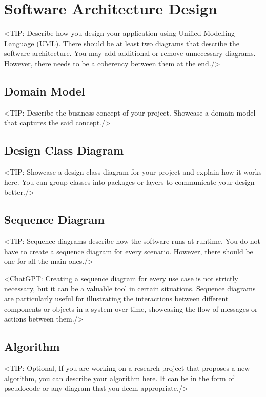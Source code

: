 \chapter{Software Architecture Design}
\label{chap:software-architecture-design}
<TIP: Describe how you design your application using Unified Modelling
Language (UML). There should be at least two diagrams that describe the
software architecture. You may add additional or remove unnecessary diagrams.
However, there needs to be a coherency between them at the end./>

\section{Domain Model}
\label{section:domain-model}
<TIP: Describe the business concept of your project. Showcase a
domain model that captures the said concept./>

\section{Design Class Diagram}
\label{section:design-class-diagram}
<TIP: Showcase a design class diagram for your project and explain
how it works here. You can group classes into packages or layers to communicate your
design better./>

\section{Sequence Diagram}
\label{section:sequence-diagram}
<TIP: Sequence diagrams describe how the software runs at runtime.
You do not have to create a sequence diagram for every scenario. However,
there should be one for all the main ones./>

<ChatGPT: Creating a sequence diagram for every use case is not
strictly necessary, but it can be a valuable tool in certain situations. Sequence
diagrams are particularly useful for illustrating the interactions between different
components or objects in a system over time, showcasing the flow of messages
or actions between them./>

\section{Algorithm}
\label{section:algorithm}
<TIP: Optional, If you are working on a research project that proposes a new
algorithm, you can describe your algorithm here. It can be in the form of
pseudocode or any diagram that you deem appropriate./>